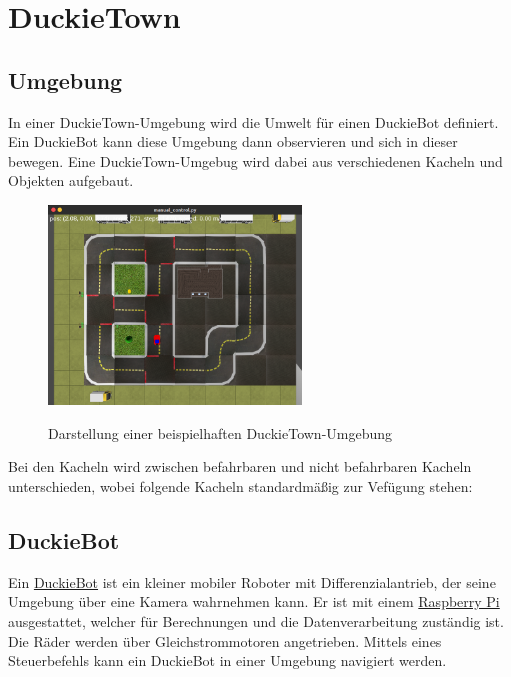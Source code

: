 \chapter{DuckieTown}

\section{Umgebung}

In einer DuckieTown-Umgebung wird die Umwelt für einen DuckieBot definiert. Ein DuckieBot kann diese Umgebung dann observieren und sich in dieser bewegen. Eine DuckieTown-Umgebug wird dabei aus verschiedenen Kacheln und Objekten aufgebaut. 

\begin{figure}[H]
	\centering
	\includegraphics[width=0.6\textwidth]{kapitel2/images/duckietown-umgebung.png}
	\label{fig:duckietown-umgebung}
	\caption{Darstellung einer beispielhaften DuckieTown-Umgebung}
\end{figure}

Bei den Kacheln wird zwischen befahrbaren und nicht befahrbaren Kacheln unterschieden, wobei folgende Kacheln standardmäßig zur Vefügung stehen:

\section{DuckieBot}

Ein \href{https://get.duckietown.com/products/duckiebot-db18}{DuckieBot} ist ein kleiner mobiler Roboter mit Differenzialantrieb, der seine Umgebung über eine Kamera wahrnehmen kann. Er ist mit einem \href{https://www.raspberrypi.org/}{Raspberry Pi} ausgestattet, welcher für Berechnungen und die Datenverarbeitung zuständig ist. Die  Räder werden über Gleichstrommotoren angetrieben. Mittels eines Steuerbefehls kann ein DuckieBot in einer Umgebung navigiert werden. \cite{duckietown_platform}

